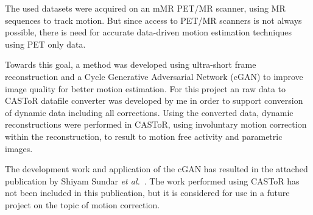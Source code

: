 The used datasets were acquired on an mMR PET/MR scanner, using MR sequences to track motion. But since access to PET/MR scanners is not always possible, there is need for accurate data-driven motion estimation techniques using PET only data. 

Towards this goal, a method was developed using ultra-short frame reconstruction 
and a Cycle Generative Adversarial Network (cGAN) to improve image quality for better motion estimation. 
For this project an raw data to CASToR datafile converter was developed by me in order to support conversion of dynamic data including all corrections. Using the converted data, dynamic reconstructions were performed in CASToR, using involuntary motion correction within the reconstruction, to result to motion free activity and parametric images. 

The development work and application of the cGAN has resulted in the attached publication by Shiyam Sundar \textit{et al.}~\cite{ShiyamSundar2020}. The work performed using CASToR has not been included in this publication, but it is considered for use in a future project on the topic of motion correction.

\cleardoublepage

\cleardoublepage
